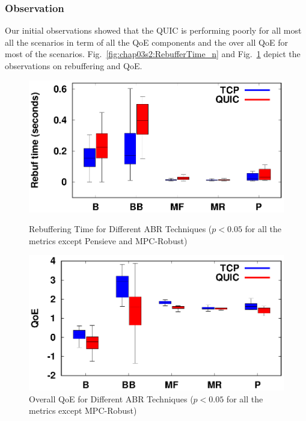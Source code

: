 \subsubsection{Observation}
Our initial observations showed that the QUIC is performing poorly for all most all the scenarios in term of all the QoE components and the over all QoE for most of the scenarios. Fig.~\ref{fig:chap03s2:RebufferTime_n} and Fig.~\ref{fig:chap03s2:QOE_n} depict the observations on rebuffering and QoE.
\begin{figure}[!h]
%	
	\begin{minipage}[t]{0.48\linewidth}
		\includegraphics[width=\linewidth]{img/QUIC/rebuf_box}
		\caption{\label{fig:chap03s2:RebufferTime_n}Rebuffering Time for Different ABR Techniques ($p<0.05$ for all the metrics except Pensieve and MPC-Robust)}
	\end{minipage}\hfill
	\begin{minipage}[t]{0.48\linewidth}
		\includegraphics[width=\linewidth]{img/QUIC/qoe_box}
		\caption{\label{fig:chap03s2:QOE_n}Overall QoE for Different ABR Techniques ($p<0.05$ for all the metrics except MPC-Robust)}
	\end{minipage}
\end{figure}
